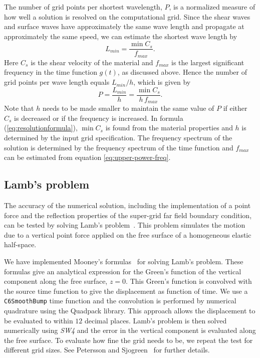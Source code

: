 \documentclass[11pt]{report}
\begin{document}
The number of grid points per shortest wavelength, $P$, is a normalized measure of how well a
solution is resolved on the computational grid. Since the shear waves and surface waves have
approximately the same wave length and propagate at approximately the same speed, we can estimate
the shortest wave length by
\[
 L_{min} = \dfrac{\min C_s}{f_{max}}.
\]
Here $C_s$ is the shear velocity of the material and $f_{max}$ is the largest significant frequency
in the time function $g(t)$, as discussed above. Hence the number of grid points per wave length
equals $L_{min}/h$, which is given by
%
\begin{equation}\label{eq:resolutionformula}
  P = \frac{L_{min}}{h} = \dfrac{\min C_s}{h\,f_{max}}. 
\end{equation}
Note that $h$ needs to be made smaller to maintain the same value of $P$ if either $C_s$ is
decreased or if the frequency is increased. In formula (\ref{eq:resolutionformula}), $\min C_s$ is
found from the material properties and $h$ is determined by the input grid specification.  The
frequency spectrum of the solution is determined by the frequency spectrum of the time
function and $f_{max}$ can be estimated from equation \eqref{eq:upper-power-freq}.

\subsection{Lamb's problem}
\label{sec:lamb}

The accuracy of the numerical solution, including the implementation of a point force and the
reflection properties of the super-grid far field boundary condition, can be tested by solving
Lamb's problem~\cite{Lamb_1904}. This problem simulates the motion due to a vertical point force
applied on the free surface of a homogeneous elastic half-space.

We have implemented Mooney's formulas~\cite{Mooney_1974} for solving Lamb's problem. These formulas
give an analytical expression for the Green's function of the vertical component along the free
surface, $z=0$. This Green's function is convolved with the source time function to give the
displacement as function of time. We use a {\tt C6SmoothBump} time function and the convolution is
performed by numerical quadrature using the Quadpack library. This approach allows the displacement
to be evaluated to within $12$ decimal places. Lamb's problem is then solved numerically using
\emph{SW4} and the error in the vertical component is evaluated along the free surface. To evaluate
how fine the grid needs to be, we repeat the test for different grid sizes. See Petersson and
Sjogreen~\cite{PetSjo-13} for further details.
\end{document}
